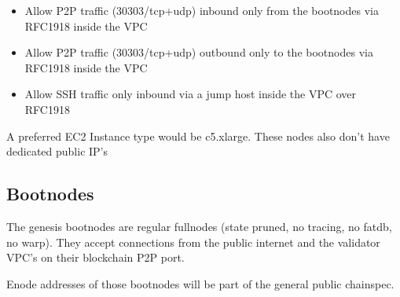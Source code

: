 \begin{itemize}
    \item Allow P2P traffic (30303/tcp+udp) inbound only from the bootnodes via RFC1918 inside the VPC
    \item Allow P2P traffic (30303/tcp+udp) outbound only to the bootnodes via RFC1918 inside the VPC
    \item Allow SSH traffic only inbound via a jump host inside the VPC over RFC1918
\end{itemize}

A preferred EC2 Instance type would be c5.xlarge. These nodes also don't have dedicated public IP's

\subsection{Bootnodes}

The genesis bootnodes are regular fullnodes (state pruned, no tracing, no fatdb, no warp).
They accept connections from the public internet and the validator VPC's on their blockchain P2P port.

Enode addresses of those bootnodes will be part of the general public chainspec.

